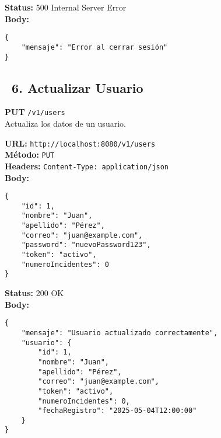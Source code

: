 \begin{tcolorbox}[response]
    \textbf{Status:} 500 Internal Server Error\\
    \textbf{Body:}
    \begin{verbatim}
{
    "mensaje": "Error al cerrar sesión"
}
    \end{verbatim}
\end{tcolorbox}

\subsection*{\faServer\ 6. Actualizar Usuario}
\begin{tcolorbox}[endpoint]
    \textbf{PUT} \texttt{/v1/users}\\
    Actualiza los datos de un usuario.
\end{tcolorbox}

\begin{tcolorbox}[request]
    \textbf{URL:} \textcolor{urlColor}{\texttt{http://localhost:8080/v1/users}}\\
    \textbf{Método:} \textcolor{methodColor}{\texttt{PUT}}\\
    \textbf{Headers:} \textcolor{headerColor}{\texttt{Content-Type: application/json}}\\
    \textbf{Body:}
    \begin{verbatim}
{
    "id": 1,
    "nombre": "Juan",
    "apellido": "Pérez",
    "correo": "juan@example.com",
    "password": "nuevoPassword123",
    "token": "activo",
    "numeroIncidentes": 0
}
    \end{verbatim}
\end{tcolorbox}

\begin{tcolorbox}[response]
    \textbf{Status:} 200 OK\\
    \textbf{Body:}
    \begin{verbatim}
{
    "mensaje": "Usuario actualizado correctamente",
    "usuario": {
        "id": 1,
        "nombre": "Juan",
        "apellido": "Pérez",
        "correo": "juan@example.com",
        "token": "activo",
        "numeroIncidentes": 0,
        "fechaRegistro": "2025-05-04T12:00:00"
    }
}
    \end{verbatim}
\end{tcolorbox}

